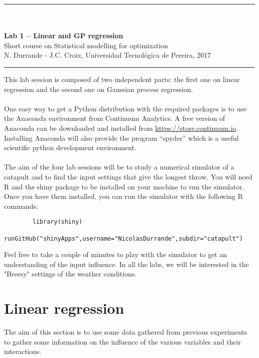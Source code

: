 \documentclass[12pt]{scrartcl}
\begin{document}
\begin{center}
	\rule{\textwidth}{1pt}
	\\ \ \\
	{\LARGE \textbf{Lab 1 -- Linear and GP regression}}\\
	\vspace{3mm}
	{\large Short course on Statistical modelling for optimization\\ \vspace{3mm}}
	{\normalsize N. Durrande - J.C. Croix, Universidad Tecnol\'ogica de Pereira, 2017}\\
	\vspace{3mm}
	\rule{\textwidth}{1pt}
	\vspace{5mm}
\end{center}
This lab session is composed of two independent parts: the first one on linear regression and the second one on Gaussian process regression.

\paragraph{}
\noindent One easy way to get a Python distribution with the required packages is to use the Anaconda environment from Continuum Analytics.
A free version of Anaconda can be downloaded and installed from  \url{https://store.continuum.io}. Installing Anaconda will also provide the program ``spyder'' which is a useful scientific python development environment.

\paragraph{}
\noindent
The aim of the four lab sessions will be to study a numerical simulator of a catapult and to find the input settings that give the longest throw. You will need R and the shiny package to be installed on your machine to run the simulator. Once you have them installed, you can run the simulator with the following R commands:
\begin{verbatim}
		library(shiny)
		runGitHub("shinyApps",username="NicolasDurrande",subdir="catapult")
\end{verbatim}
Feel free to take a couple of minutes to play with the simulator to get an understanding of the input influence. In all the labs, we will be interested in the "Breesy" settings of the weather conditions.

\section{Linear regression}
The aim of this section is to use some data gathered from previous experiments to gather some information on the influence of the various variables and their interactions.
\end{document}
